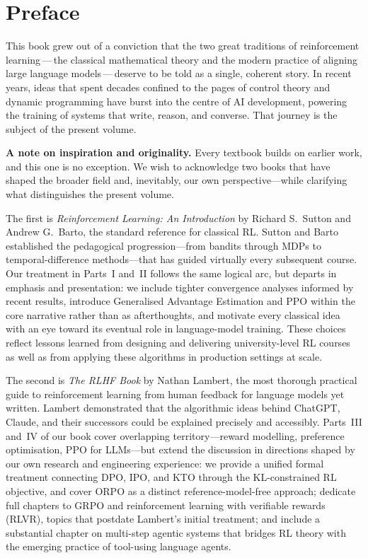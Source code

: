 \chapter*{Preface}

This book grew out of a conviction that the two great traditions of reinforcement learning\,---\,the
classical mathematical theory and the modern practice of aligning large language
models\,---\,deserve to be told as a single, coherent story.  In recent years, ideas that spent
decades confined to the pages of control theory and dynamic programming have burst into the
centre of AI development, powering the training of systems that write, reason, and converse.
That journey is the subject of the present volume.

\medskip

\textbf{A note on inspiration and originality.}\quad
Every textbook builds on earlier work, and this one is no exception.  We wish to
acknowledge two books that have shaped the broader field and, inevitably, our
own perspective---while clarifying what distinguishes the present volume.

The first is \emph{Reinforcement Learning: An Introduction} by Richard
S.\ Sutton and Andrew G.\ Barto, the standard reference for classical RL\@.
Sutton and Barto established the pedagogical progression---from bandits
through MDPs to temporal-difference methods---that has guided virtually every
subsequent course.  Our treatment in Parts~I and~II follows the same logical
arc, but departs in emphasis and presentation: we include tighter convergence
analyses informed by recent results, introduce Generalised Advantage
Estimation and PPO within the core narrative rather than as afterthoughts, and
motivate every classical idea with an eye toward its eventual role in
language-model training.  These choices reflect lessons learned from designing
and delivering university-level RL courses as well as from applying these
algorithms in production settings at scale.

The second is \emph{The RLHF Book} by Nathan Lambert, the most thorough
practical guide to reinforcement learning from human feedback for language
models yet written.  Lambert demonstrated that the algorithmic ideas behind
ChatGPT, Claude, and their successors could be explained precisely and
accessibly.  Parts~III and~IV of our book cover overlapping territory---reward
modelling, preference optimisation, PPO for LLMs---but extend the discussion
in directions shaped by our own research and engineering experience: we
provide a unified formal treatment connecting DPO, IPO, and KTO
through the KL-constrained RL objective, and cover ORPO as a distinct
reference-model-free approach; dedicate full chapters to GRPO and
reinforcement learning with verifiable rewards (RLVR), topics that
postdate Lambert's initial treatment; and include a substantial chapter on
multi-step agentic systems that bridges RL theory with the emerging practice
of tool-using language agents.

